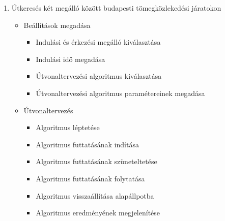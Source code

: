 \begin{enumerate}
    \item Útkeresés két megálló között budapesti tömegközlekedési járatokon
    \begin{itemize}
        \item Beállítások megadása
        \begin{itemize}
            \item Indulási és érkezési megálló kiválasztása
            \item Indulási idő megadása
            \item Útvonaltervezési algoritmus kiválasztása
            \item Útvonaltervezési algoritmus paramétereinek megadása
        \end{itemize}
        \item Útvonaltervezés
        \begin{itemize}
            \item Algoritmus léptetése
            \item Algoritmus futtatásának indítása
            \item Algoritmus futtatásának szüneteltetése
            \item Algoritmus futtatásának folytatása
            \item Algoritmus visszaállítása alapállpotba
            \item Algoritmus eredményének megjelenítése
        \end{itemize}
    \end{itemize}
\end{enumerate}

